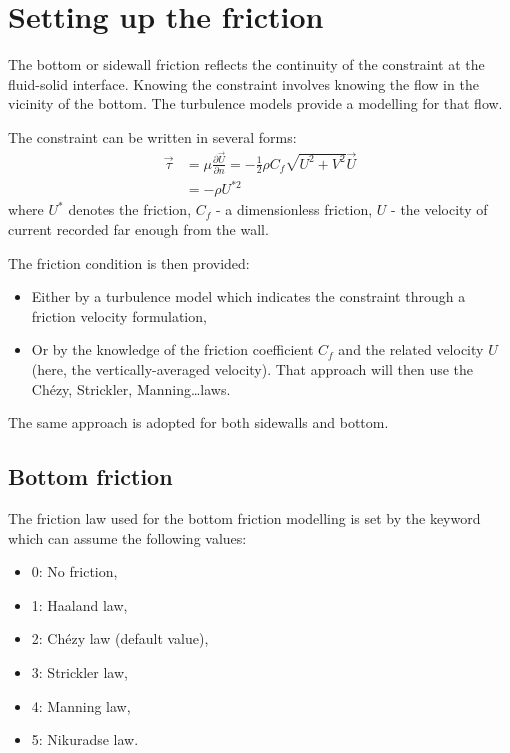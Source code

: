 \section{Setting up the friction}

The bottom or sidewall friction reflects the continuity of the constraint at
the fluid-solid interface. Knowing the constraint involves knowing the flow in
the vicinity of the bottom. The turbulence models provide a modelling for that
flow.

The constraint can be written in several forms:
\begin{align}
\vec{\tau } & = \mu \frac{\partial \vec{U}}{\partial n}
            = -\frac{1}{2} \rho C_{f} \sqrt{U^{2} +V^{2} } \vec{U}\\
            & = -\rho U^{*2} 
\end{align}
where $U^{*}$ denotes the friction, $C_{f}$ - a dimensionless friction, $U$ -
the velocity of current recorded far enough from the wall.

The friction condition is then provided:

\begin{itemize}
\item  Either by a turbulence model which indicates the constraint through a
friction velocity formulation,

\item  Or by the knowledge of the friction coefficient $C_{f}$ and the related
velocity $U$ (here, the vertically-averaged velocity). That approach will then
use the Chézy, Strickler, Manning\dots  laws.
\end{itemize}

The same approach is adopted for both sidewalls and bottom.


\subsection{Bottom friction}

The friction law used for the bottom friction modelling is set by the keyword
 which can assume the following values:

\begin{itemize}
\item  0: No friction,

\item  1: Haaland law,

\item  2: Chézy law (default value),

\item  3: Strickler law,

\item  4: Manning law,

\item  5: Nikuradse law.
\end{itemize}

